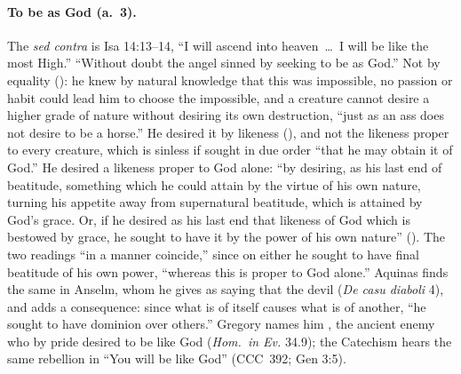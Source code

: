 \paragraph{To be as God (a.~3).} The \emph{sed contra} is Isa 14:13--14,
``I will ascend into heaven~\dots\ I will be like the most High.''
``Without doubt the angel sinned by seeking to be as God.'' Not by
equality (): he knew by natural knowledge that
this was impossible, no passion or habit could lead him to choose the
impossible, and a creature cannot desire a higher grade of nature
without desiring its own destruction, ``just as an ass does not desire
to be a horse.'' He desired it by likeness (),
and not the likeness proper to every creature, which is sinless if
sought in due order ``that he may obtain it of God.'' He desired a
likeness proper to God alone: ``by desiring, as his last end of
beatitude, something which he could attain by the virtue of his own
nature, turning his appetite away from supernatural beatitude, which is
attained by God's grace. Or, if he desired as his last end that likeness
of God which is bestowed by grace, he sought to have it by the power of
his own nature'' (). The two readings
``in a manner coincide,'' since on either he sought to have final
beatitude of his own power, ``whereas this is proper to God alone.''
Aquinas finds the same in Anselm, whom he gives as saying that the devil
 (\emph{De casu
diaboli} 4), and adds a consequence: since what is of itself causes what
is of another, ``he sought to have dominion over others.'' Gregory names
him , the ancient enemy who by pride desired to be like God
(\emph{Hom.~in Ev.} 34.9); the Catechism hears the same rebellion in
``You will be like God'' (CCC~392; Gen 3:5).

